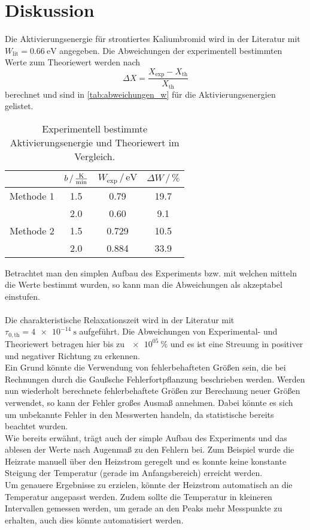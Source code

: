 \section{Diskussion}
\label{sec:Diskussion}
Die Aktivierungsenergie für strontiertes Kaliumbromid wird in der Literatur mit $W_\text{lit} = \SI{0.66}{\electronvolt}$\cite{muccillo} angegeben.
Die Abweichungen der experimentell bestimmten Werte zum Theoriewert werden nach
\begin{equation*}
    \Delta X = \frac{X_\text{exp} - X_\text{th}}{X_\text{th}}
\end{equation*}
berechnet und sind in \autoref{tab:abweichungen_w} für die Aktivierungsenergien gelistet.

\begin{table}
    \centering
    \begin{tabular}{c S[table-format=1.1] | S[table-format=1.3] S[table-format=2.2]}
        \toprule
        & $b \,/\, \si{\frac{\kelvin}{\minute}}$ & $W_\text{exp} \,/\, \si{\electronvolt}$ & $\Delta W \,/\, \si{\percent}$ \\
        \midrule
        Methode 1 & 1.5 & 0.79 & 19.7 \\
        & 2.0 & 0.60 & 9.1 \\
        Methode 2 & 1.5 & 0.729 & 10.5 \\
        & 2.0 & 0.884 & 33.9 \\
        \bottomrule
    \end{tabular}
    \caption{Experimentell bestimmte Aktivierungsenergie und Theoriewert im Vergleich.}
    \label{tab:abweichungen_w}
\end{table}
\FloatBarrier

Betrachtet man den simplen Aufbau des Experiments bzw. mit welchen mitteln die Werte bestimmt wurden, so kann man die Abweichungen als akzeptabel einstufen.
\\
\\
Die charakteristische Relaxationszeit wird in der Literatur mit $\tau_{0, \text{th}} = \SI{4e-14}{\second}$\cite{muccillo} aufgeführt.
Die Abweichungen von Experimental- und Theoriewert betragen hier bis zu $\SI{e05}{\percent}$ und es ist eine Streuung in positiver und negativer Richtung zu erkennen.
\\
Ein Grund könnte die Verwendung von fehlerbehafteten Größen sein, die bei Rechnungen durch die Gaußsche Fehlerfortpflanzung beschrieben werden.
Werden nun wiederholt berechnete fehlerbehaftete Größen zur Berechnung neuer Größen verwendet, so kann der Fehler großes Ausmaß annehmen.
Dabei könnte es sich um unbekannte Fehler in den Messwerten handeln, da statistische bereits beachtet wurden.
\\
Wie bereits erwähnt, trägt auch der simple Aufbau des Experiments und das ablesen der Werte nach Augenmaß zu den Fehlern bei. 
Zum Beispiel wurde die Heizrate manuell über den Heizstrom geregelt und es konnte keine konstante Steigung der Temperatur (gerade im Anfangsbereich) erreicht werden.
\\
Um genauere Ergebnisse zu erzielen, könnte der Heizstrom automatisch an die Temperatur angepasst werden.
Zudem sollte die Temperatur in kleineren Intervallen gemessen werden, um gerade an den Peaks mehr Messpunkte zu erhalten, auch dies könnte automatisiert werden.